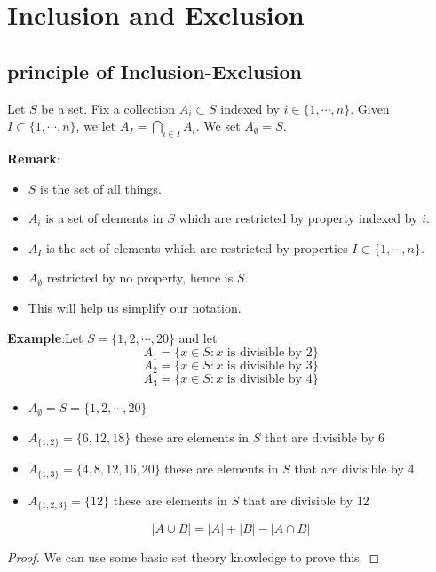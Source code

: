\chapter{Inclusion and Exclusion}


\section{principle of Inclusion-Exclusion}

\begin{definition}
    Let $S$ be a set. Fix a collection $A_i \subset S$ indexed by $i \in \{1,\cdots,n\}$. 
    Given $I \subset \{1,\cdots,n\}$, we let $A_I= \bigcap_{i \in I}A_i$. We set $A_{\emptyset}=S$.
\end{definition}
\textbf{Remark}:
\begin{itemize}
    \item $S$ is the set of all things.
    \item $A_i$ is a set of elements in $S$ which are restricted by property indexed by $i$.
    \item $A_I$ is the set of elements which are restricted by properties $I \subset \{1,\cdots,n\}$.
    \item $A_{\emptyset}$ restricted by no property, hence is $S$.
    \item This will help us simplify our notation.
\end{itemize}

\textbf{Example}:Let $S=\{1,2,\cdots,20\}$ and let 
$$A_1=\{x \in S: x \text{ is divisible by } 2\}$$
$$A_2=\{x \in S: x \text{ is divisible by } 3\}$$
$$A_3=\{x \in S: x \text{ is divisible by } 4\}$$
\begin{itemize}
    \item $A_{\emptyset}=S=\{1,2,\cdots,20\}$
    \item $A_{\{1,2\}}=\{6,12,18\}$ these are elements in $S$ that are divisible by 6
    \item $A_{\{1,3\}}=\{4,8,12,16,20\}$ these are elements in $S$ that are divisible by 4
    \item $A_{\{1,2,3\}}=\{12\}$ these are elements in $S$ that are divisible by 12
\end{itemize}

\begin{theorem}
    $$|A \cup B|=|A|+|B|-|A \cap B|$$
\end{theorem}
\begin{proof}
    We can use some basic set theory knowledge to prove this.
\end{proof}

